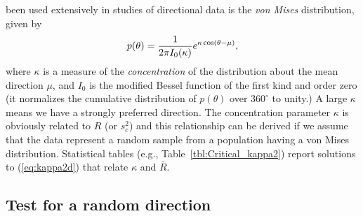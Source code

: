 been used extensively in studies of directional data is the \emph{von Mises} distribution, given by
\begin{equation}
	\index{Probability distribution!von Mises}
	\index{von Mises distribution}
p(\theta) = \frac{1}{2 \pi I_0 ( \kappa)} e^{\kappa \cos\left( \theta - \mu \right)},
\label{eg:von_Mises}
\end{equation}
where $\kappa$ is a measure of the \emph{concentration} of the distribution about the mean direction $\mu$, and $I_0$ is 
the modified Bessel function of the first kind and order zero (it normalizes the 
cumulative distribution of $p(\theta)$ over $360^{\circ}$ to unity.)  A large $\kappa$ means we have a strongly preferred direction.
The concentration parameter $\kappa$ is obviously related to
$R$ (or $s_c^2$) and this relationship can be 
derived if we assume that the data represent a random sample from a population having a von Mises 
distribution.  Statistical tables (e.g., Table~\ref{tbl:Critical_kappa2}) report solutions to (\ref{eq:kappa2d}) that relate $\kappa$ and $\bar{R}$.

\subsection{Test for a random direction}

